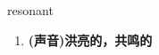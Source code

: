 
\begin{frame}
{\huge resonant}
\begin{center}
\begin{enumerate}\Large
  \item \textbf{(声音)洪亮的，共鸣的}
\end{enumerate}
\end{center}
\end{frame}
